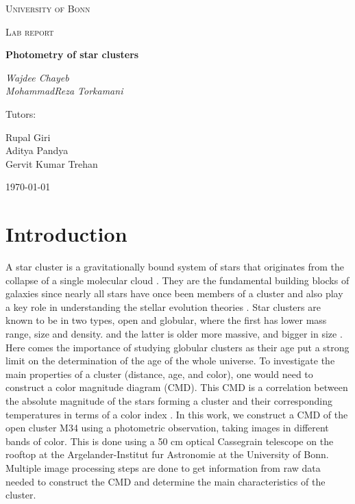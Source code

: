 \documentclass[12pt]{article}
\begin{document}
\begin{titlepage}
	\centering
	{\textsc{University of Bonn} \par}
	\vspace{1cm}
	{\Large \textsc{Lab report}\par}
	\vspace{1.5cm}
	{\huge\bfseries  Photometry of star clusters\par}
	\vspace{2cm}
	{\Large\itshape Wajdee Chayeb \\
	MohammadReza Torkamani\par}
	\vfill
	Tutors:\par
	Rupal Giri\\
	Aditya Pandya\\
        Gervit Kumar Trehan

	\vfill

	{\large \today\par}
\end{titlepage}

\tableofcontents


\section{Introduction}
A star cluster is a gravitationally bound system of stars that originates from the collapse of a single molecular cloud \cite{lecturenote}. They are the fundamental building blocks of galaxies since nearly all stars have once been members of a cluster and also play a key role in understanding the stellar evolution theories \cite{lecturenote}. 
Star clusters are known to be in two types, open and globular, where the first has lower mass range, size and density. and the latter is older more massive, and bigger in size \cite{lecturenote}. Here comes the importance of studying globular clusters as their age put a strong limit on the determination of the age of the whole universe. 
To investigate the main properties of a cluster (distance, age, and color), one would need to construct a color magnitude diagram (CMD). This CMD is a correlation between the absolute magnitude of the stars forming a cluster and their corresponding temperatures in terms of a color index \cite{lecturenote}. 
In this work, we construct a CMD of the open cluster M34 using a photometric observation, taking images in different bands of color. This is done using a 50 cm optical Cassegrain telescope on the rooftop at the Argelander-Institut fur Astronomie at the University of Bonn. Multiple image processing steps are done to get information from raw data needed to construct the CMD and determine the main characteristics of the cluster.  
\end{document}
